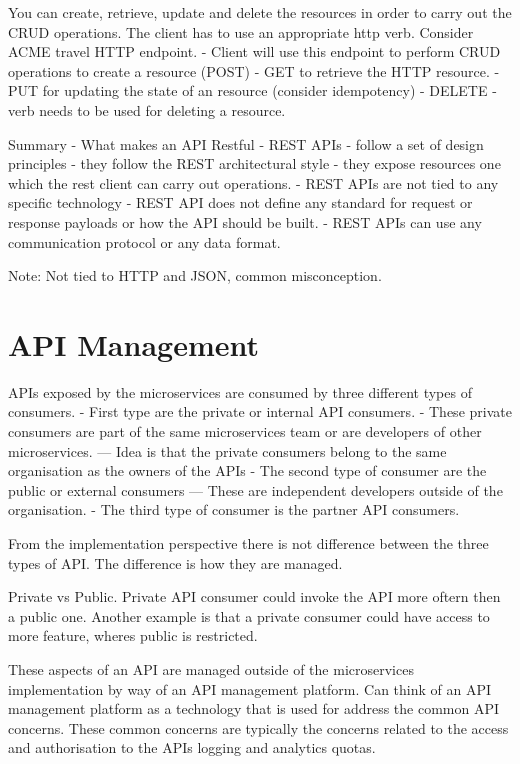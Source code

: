You can create, retrieve, update and delete the resources in order to carry out the CRUD operations.
The client has to use an appropriate http verb.
Consider ACME travel HTTP endpoint.
- Client will use this endpoint to perform CRUD operations to create a resource (POST)
- GET to retrieve the HTTP resource.
- PUT for updating the state of an resource (consider idempotency)
- DELETE - verb needs to be used for deleting a resource.

Summary - What makes an API Restful
- REST APIs - follow a set of design principles
- they follow the REST architectural style
- they expose resources one which the rest client can carry out operations.
- REST APIs are not tied to any specific technology
- REST API does not define any standard for request or response payloads or how the API should be built.
- REST APIs can use any communication protocol or any data format.

Note: Not tied to HTTP and JSON, common misconception.

\section{API Management}
APIs exposed by the microservices are consumed by three different types of consumers.
- First type are the private or internal API consumers.
- These private consumers are part of the same microservices team or are developers of other microservices.
--- Idea is that the private consumers belong to the same organisation as the owners of the APIs
- The second type of consumer are the public or external consumers
--- These are independent developers outside of the organisation.
- The third type of consumer is the partner API consumers.

From the implementation perspective there is not difference between the three types of API.
The difference is how they are managed.

Private vs Public.
Private API consumer could invoke the API more oftern then a public one.
Another example is that a private consumer could have access to more feature, wheres public is restricted.

These aspects of an API are managed outside of the microservices implementation by way of an API management platform.
Can think of an API management platform as a technology that is used for address the common API concerns.
These common concerns are typically the concerns related to the access and authorisation to the APIs logging and analytics quotas.

